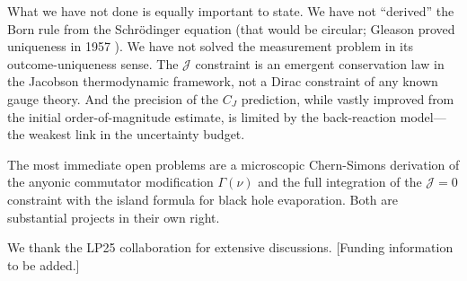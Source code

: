 \documentclass[aps,prd,reprint,superscriptaddress,twocolumn]{revtex4-2}
\begin{document}
What we have not done is equally important to state. We have not ``derived'' the Born rule from the Schr\"{o}dinger equation (that would be circular; Gleason proved uniqueness in 1957 \cite{Gleason1957}). We have not solved the measurement problem in its outcome-uniqueness sense. The $\mathcal{J}$ constraint is an emergent conservation law in the Jacobson thermodynamic framework, not a Dirac constraint of any known gauge theory. And the precision of the $C_J$ prediction, while vastly improved from the initial order-of-magnitude estimate, is limited by the back-reaction model---the weakest link in the uncertainty budget.

The most immediate open problems are a microscopic Chern-Simons derivation of the anyonic commutator modification $\Gamma(\nu)$ and the full integration of the $\mathcal{J}=0$ constraint with the island formula \cite{Penington2020,Almheiri2019} for black hole evaporation. Both are substantial projects in their own right.

\begin{acknowledgments}
We thank the LP25 collaboration for extensive discussions. [Funding information to be added.]
\end{acknowledgments}
\end{document}
